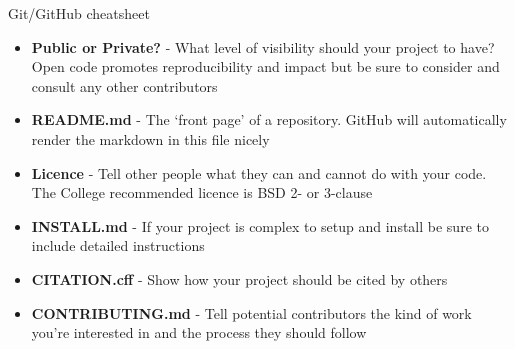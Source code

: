 \documentclass[9pt]{extarticle}
\def\itempad{-1pt}
\begin{document}
\thispagestyle{empty}

\begin{center}
  {\LARGE
  Git/GitHub cheatsheet}
\end{center}

\begin{bluebox}[title=Things to think when publishing code]
  \begin{itemize}
    \itemsep\itempad
  \item \textbf{Public or Private?} - What level of visibility should your
    project to have? Open code promotes reproducibility and impact but be sure
    to consider and consult any other contributors
  \item \textbf{README.md} - The `front page' of a repository. GitHub will
    automatically render the markdown in this file nicely
  \item \textbf{Licence} - Tell other people what they can and cannot do with
    your code. The College recommended licence is BSD 2- or 3-clause
  \item \textbf{INSTALL.md} - If your project is complex to setup and install be
    sure to include detailed instructions
  \item \textbf{CITATION.cff} - Show how your project should be cited by others
  \item \textbf{CONTRIBUTING.md} - Tell potential contributors the kind of work
    you're interested in and the process they should follow
  \end{itemize}
\end{bluebox}
\end{document}
